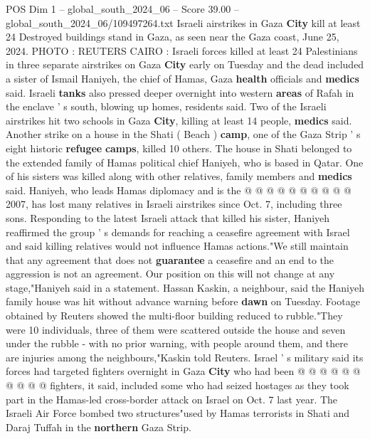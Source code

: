 \begin{textsample}{POS Dim 1 – global\_south\_2024\_06 – Score 39.00 – global\_south\_2024\_06/109497264.txt}  \label{ex:f1_pos_041}
Israeli airstrikes in Gaza \textbf{City} kill at least 24 Destroyed buildings stand in Gaza, as seen near the Gaza coast, June 25, 2024.
PHOTO : REUTERS CAIRO : Israeli forces killed at least 24 Palestinians in three separate airstrikes on Gaza \textbf{City} early on Tuesday and the dead included a sister of Ismail Haniyeh, the chief of Hamas, Gaza \textbf{health} officials and \textbf{medics} said.
Israeli \textbf{tanks} also pressed deeper overnight into western \textbf{areas} of Rafah in the enclave ' s south, blowing up homes, residents said.
Two of the Israeli airstrikes hit two schools in Gaza \textbf{City}, killing at least 14 people, \textbf{medics} said.
Another strike on a house in the Shati ( Beach ) \textbf{camp}, one of the Gaza Strip ' s eight historic \textbf{refugee} \textbf{camps}, killed 10 others.
The house in Shati belonged to the extended family of Hamas political chief Haniyeh, who is based in Qatar.
One of his sisters was killed along with other relatives, family members and \textbf{medics} said.
Haniyeh, who leads Hamas diplomacy and is the @ @ @ @ @ @ @ @ @ @ 2007, has lost many relatives in Israeli airstrikes since Oct. 7, including three sons.
Responding to the latest Israeli attack that killed his sister, Haniyeh reaffirmed the group ' s demands for reaching a ceasefire agreement with Israel and said killing relatives would not influence Hamas actions."We still maintain that any agreement that does not \textbf{guarantee} a ceasefire and an end to the aggression is not an agreement.
Our position on this will not change at any stage,"Haniyeh said in a statement.
Hassan Kaskin, a neighbour, said the Haniyeh family house was hit without advance warning before \textbf{dawn} on Tuesday.
Footage obtained by Reuters showed the multi-floor building reduced to rubble."They were 10 individuals, three of them were scattered outside the house and seven under the rubble - with no prior warning, with people around them, and there are injuries among the neighbours,"Kaskin told Reuters.
Israel ' s military said its forces had targeted fighters overnight in Gaza \textbf{City} who had been @ @ @ @ @ @ @ @ @ @ fighters, it said, included some who had seized hostages as they took part in the Hamas-led cross-border attack on Israel on Oct. 7 last year.
The Israeli Air Force bombed two structures"used by Hamas terrorists in Shati and Daraj Tuffah in the \textbf{northern} Gaza Strip.

\end{textsample}
